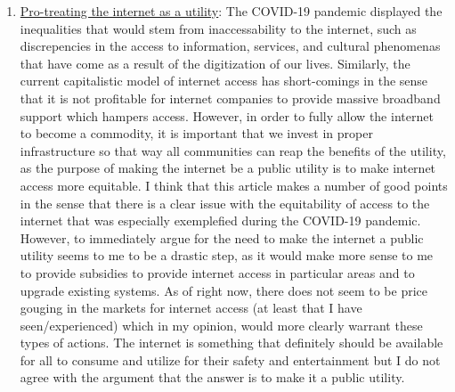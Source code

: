 \documentclass[10pt]{article}
\begin{document}
\begin{enumerate}
\begin{enumerate}
       \item \href{https://www.forbes.com/sites/forbestechcouncil/2020/06/17/the-argument-for-the-internet-as-a-utility-is-it-time-to-change-how-its-delivered/?sh=4a8c34467729}{Pro-treating the internet as a utility}: The COVID-19 pandemic displayed the inequalities that would stem from inaccessability to the internet, such as discrepencies in the access to information, services, and cultural phenomenas that have come as a result of the digitization of our lives. Similarly, the current capitalistic model of internet access has short-comings in the sense that it is not profitable for internet companies to provide massive broadband support which hampers access. However, in order to fully allow the internet to become a commodity, it is important that we invest in proper infrastructure so that way all communities can reap the benefits of the utility, as the purpose of making the internet be a public utility is to make internet access more equitable. I think that this article makes a number of good points in the sense that there is a clear issue with the equitability of access to the internet that was especially exemplefied during the COVID-19 pandemic. However, to immediately argue for the need to make the internet a public utility seems to me to be a drastic step, as it would make more sense to me to provide subsidies to provide internet access in particular areas and to upgrade existing systems. As of right now, there does not seem to be price gouging in the markets for internet access (at least that I have seen/experienced) which in my opinion, would more clearly warrant these types of actions. The internet is something that definitely should be available for all to consume and utilize for their safety and entertainment but I do not agree with the argument that the answer is to make it a public utility.

\end{enumerate}
\end{enumerate}
\end{document}
